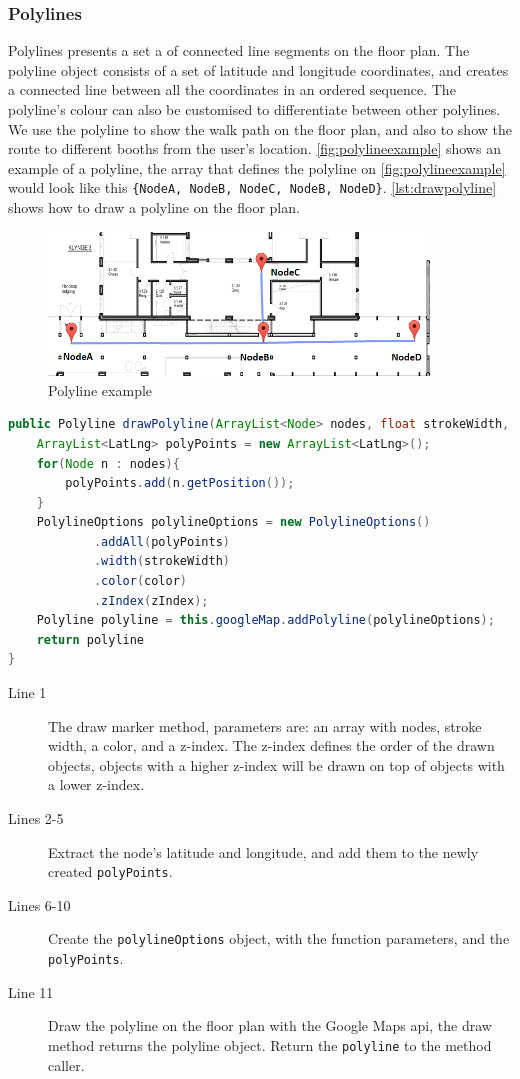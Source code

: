 \subsubsection*{Polylines}
Polylines presents a set a of connected line segments on the floor plan. The polyline object consists of a set of latitude and longitude coordinates, and creates a connected line between all the coordinates in an ordered sequence. The polyline's colour can also be customised to differentiate between other polylines. We use the polyline to show the walk path on the floor plan, and also to show the route to different booths from the user's location. \autoref{fig:polylineexample} shows an example of a polyline, the array that defines the polyline on \autoref{fig:polylineexample} would look like this \lstinline|{NodeA, NodeB, NodeC, NodeB, NodeD}|. \autoref{lst:drawpolyline} shows how to draw a polyline on the floor plan.
\begin{figure}[H]
\centering
\includegraphics[width=0.9\textwidth]{img/polylineExample.png}
\caption{Polyline example}
\label{fig:polylineexample}
\end{figure}
\begin{lstlisting}[language=java, label=lst:drawpolyline, caption=Method for drawing a polyline.]
public Polyline drawPolyline(ArrayList<Node> nodes, float strokeWidth, int color, int zIndex){
    ArrayList<LatLng> polyPoints = new ArrayList<LatLng>();
    for(Node n : nodes){
        polyPoints.add(n.getPosition());
    }
    PolylineOptions polylineOptions = new PolylineOptions()
            .addAll(polyPoints)
            .width(strokeWidth)
            .color(color)
            .zIndex(zIndex);
    Polyline polyline = this.googleMap.addPolyline(polylineOptions);
    return polyline
}
\end{lstlisting}
\begin{description}
\item[Line 1] The draw marker method, parameters are: an array with nodes, stroke width, a color, and a z-index. The z-index defines the order of the drawn objects,  objects with a higher z-index will be drawn on top of objects with a lower z-index. 
\item[Lines 2-5] Extract the node's latitude and longitude, and add them to the newly created \lstinline|polyPoints|.
\item[Lines 6-10] Create the \lstinline|polylineOptions| object, with the function parameters, and the \lstinline|polyPoints|.
\item[Line 11] Draw the polyline on the floor plan with the Google Maps \ac{api}, the draw method returns the polyline object. Return the \lstinline|polyline| to the method caller.
\end{description}

